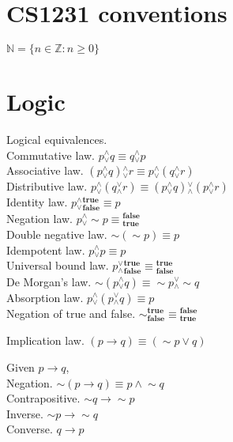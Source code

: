 \documentclass{slnotes}
\newcommand{\slnot}{\mathop{\sim}}
\newcommand{\landor}{\mathbin{{}^\land_\lor}}
\newcommand{\lorand}{\mathbin{{}^\lor_\land}}
\begin{document}
\chapter{CS1231 conventions}
\(\mathbb{N} = \{n \in \mathbb{Z} : n \ge 0\}\)
\chapter{Logic}
 Logical equivalences.\\
Commutative law. \(p \landor q \equiv q \landor p\)\\
Associative law. \((p \landor q) \landor r \equiv p \landor (q \landor r)\)\\
Distributive law. \(p \landor (q \lorand r) \equiv (p \landor q) \lorand (p \landor r)\)\\
Identity law. \(p \landor {}^\mathbf{true}_\mathbf{false} \equiv p\)\\
Negation law. \(p \landor \slnot p \equiv {}^\mathbf{false}_\mathbf{true}\)\\
Double negative law. \(\slnot(\slnot p) \equiv p\)\\
Idempotent law. \(p \landor p \equiv p\)\\
Universal bound law. \(p \lorand {}^\mathbf{true}_\mathbf{false} \equiv {}^\mathbf{true}_\mathbf{false}\)\\
De Morgan's law. \(\slnot(p \landor q) \equiv \slnot p \lorand \slnot q\)\\
Absorption law. \(p \landor (p \lorand q) \equiv p\)\\
Negation of true and false. \(\slnot{}^\mathbf{true}_\mathbf{false} \equiv {}^\mathbf{false}_\mathbf{true}\)

Implication law. \((p \to q) \equiv (\slnot p \lor q)\)

 Given \(p \to q\),\\
Negation. \(\slnot(p \to q) \equiv p \land\slnot q\)\\
Contrapositive. \(\slnot q \to \slnot p\)\\
Inverse. \(\slnot p \to \slnot q\)\\
Converse. \(q \to p\)
\end{document}
